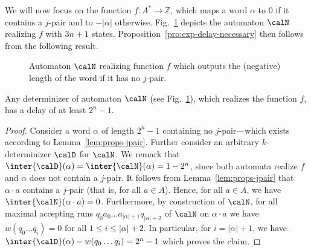 \documentclass[a4paper]{article}
\begin{document}
We will now focus on the function $f : A^* \to \mathbb{Z}$, which maps a word
$\alpha$ to $0$ if it contains a $j$-pair and to $-|\alpha|$ otherwise.
Fig.~\ref{fig:length-jpair} depicts
the automaton $\calN$ realizing $f$ with $3n + 1$ states.
Proposition~\ref{pro:exp-delay-necessary} then follows from the following
result.

\begin{figure}
\begin{center}
\caption{Automaton $\calN$ realizing function $f$ which outputs the
(negative) length of the word if it has no $j$-pair.}
\label{fig:length-jpair}
\end{center}
\end{figure}

\begin{lemma}\label{lem:high-delay}
	Any determinizer of automaton $\calN$ (see
	Fig.~\ref{fig:length-jpair}), which realizes the function $f$, has a
	delay of at least $2^{n}-1$.
\end{lemma}
\begin{proof}
	Consider a word $\alpha$ of length $2^{n} - 1$ containing no
	$j$-pair---which exists according to Lemma~\ref{lem:props-jpair}.
	Further consider an arbitrary $k$-determinizer $\calD$ for $\calN$. We
	remark that $\inter{\calD}(\alpha) = \inter{\calN}(\alpha) = 1 -
	2^{n}$, since both automata realize $f$ and $\alpha$ does not contain a
	$j$-pair. It follows from Lemma~\ref{lem:props-jpair} that $\alpha \cdot
	a$ contains a $j$-pair (that is, for all $a \in A$). Hence, for all $a
	\in A$, we have $\inter{\calN}(\alpha \cdot a) = 0$. Furthermore, by
	construction of $\calN$, for all maximal accepting runs $q_0 a_0 \dots
	a_{|\alpha| +1} q_{|\alpha| +2}$ of $\calN$ on $\alpha \cdot a$ we have
	$w(q_0 \dots q_i) = 0$ for all $1 \le i \le |\alpha| + 2$. In
	particular, for $i = |\alpha| + 1$, we have $\inter{\calD}(\alpha) -
	w(q_0 \dots q_i) = 2^{n} - 1$ which proves the claim.
\end{proof}
\end{document}
